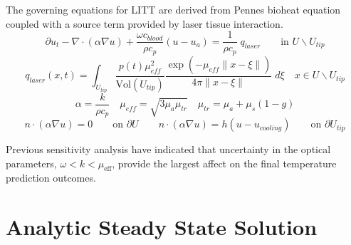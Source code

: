 \documentclass{article}         %
\theoremstyle{definition}
\theoremstyle{remark}
\begin{document}

The governing equations for LITT are derived from Pennes bioheat
equation coupled with a source term provided by laser tissue
interaction. 
\begin{equation} \label{BioheatPDE}
  \partial u_t   
 -\nabla \cdot  (   \alpha \nabla u  ) 
 + \frac{\omega c_\textit{blood}}{\rho c_p} (u  - u_a )
 = \frac{1}{\rho c_p} \; q_{laser}
     \qquad \text{in } U \backslash U_{tip}
\end{equation}
\[
   q_{laser}(x,t)  = 
    \int_{U_{tip}}
 \frac{p(t) \mu_\textit{eff}^2}{\text{Vol}(U_{tip}) }  
   \frac{ \exp(-\mu_\textit{eff} \| x -{ \xi}\|) }
      {4\pi \| x-{ \xi}\|} \; d\xi
   \quad   x \in U \backslash U_{tip}
\]
\[
  \alpha  = \frac{k}{\rho c_p}
\quad
  \mu_{eff}  = \sqrt{ 3 {\mu_a} \mu_{tr} }
\quad
 \mu_{tr} = \mu_a  + \mu_s (1-g)
\]
\[
n \cdot ( \alpha \nabla u  )  = 0 
                       \qquad \text{on } \partial U
\qquad
n \cdot ( \alpha \nabla u  )  = h (u - u_\textit{cooling}) 
                       \qquad \text{on } \partial U_\textit{tip}
\]

Previous sensitivity analysis have indicated that uncertainty in 
the optical parameters, $ \omega < k < \mu_\text{eff}$, 
provide the largest affect on the final temperature prediction outcomes.

\section{Analytic Steady State Solution}\label{AnalyticBioheatModel}
\end{document}
